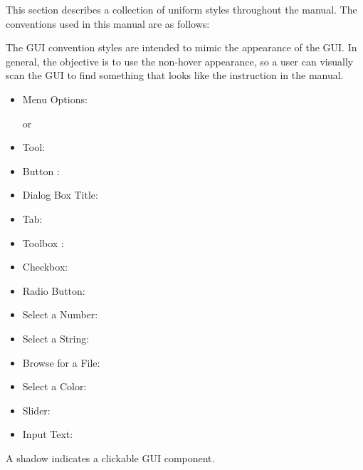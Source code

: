

\label{label_conventions}

This section describes a collection of uniform styles throughout the manual. The conventions used in this manual are as follows:


The GUI convention styles are intended to mimic the appearance of the GUI. In general, the objective is to use the non-hover appearance, so a user can visually scan the GUI to find something that looks like the instruction in the manual.

\begin{itemize}[label=--,itemsep=5pt]
\item Menu Options:  \arrow
{}

or

 \arrow
{} \arrow {}
\item Tool: 
\item Button : 
\item Dialog Box Title: 
\item Tab: 

\item Toolbox : 
\item Checkbox: 
\item Radio Button:   
\item Select a Number: 
\item Select a String: 
\item Browse for a File: \browsebutton
\item Select a Color: 
\item Slider: 
\item Input Text: 
\end{itemize}
A shadow indicates a clickable GUI component.


